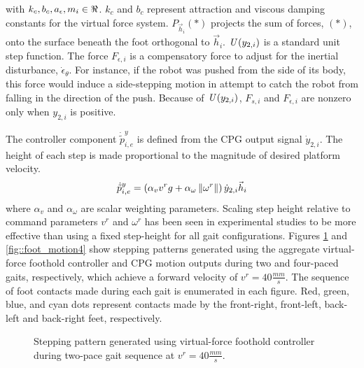 	 	with $k_{c},b_{c},a_{\epsilon},m_{i} \in \Re$.
		$k_{c}$ and $b_{c}$ represent  attraction and viscous damping constants for the virtual force system. ${P}_{\vec{h}_{i}}(*)$ projects the sum of  forces, $(*)$, onto the surface beneath the \Ith foot orthogonal to $\vec{h}_{i}$. $\emph{U}\left(y_{2,i}\right)$ is a standard unit step function. The force $F_{\epsilon,i}$ is a compensatory force to adjust for the inertial disturbance,  $\dot{\epsilon}_{\theta}$. For instance, if the robot was pushed from the side of its body, this force would induce a side-stepping motion in attempt to catch the robot from falling in the direction of the push. Because of $\emph{U}\left(y_{2,i}\right)$, $F_{s,i}$ and $F_{\epsilon,i}$ are nonzero only when $y_{2,i}$ is positive.

		The controller component $\dot{\tilde{p}}_{i,e}^{y}$ is defined from the CPG output signal $\dot{y}_{2,i}$. The height of each step is made proportional to the magnitude of desired platform velocity.
			\begin{equation}
				\dot{\tilde{p}}_{i,e}^{y} 	= { \left( \alpha_{v} v^{r}g + \alpha_{\omega} \left\lVert\omega^{r}\right\rVert \right) \dot{y}_{2,i}} \vec{h}_{i} 
				\label{eq::foot_height_control}
			\end{equation}
		where $\alpha_{v}$ and $\alpha_{\omega}$ are scalar weighting parameters. Scaling step height relative to command parameters $v^{r}$ and $\omega^{r}$ has been seen in experimental studies to be more effective than using a fixed step-height for all gait configurations. Figures \ref{fig::foot_motion2} and \ref{fig::foot_motion4} show stepping patterns generated using the aggregate virtual-force foothold controller and CPG motion outputs during two and four-paced gaits, respectively, which achieve a forward velocity of $v^{r}=40\frac{mm}{s}$. The sequence of foot contacts made during each gait is enumerated in each figure. Red, green, blue, and cyan dots represent contacts made by the front-right, front-left, back-left and back-right feet, respectively.
%
			\begin{figure}[!h]
				\centering
				\caption{Stepping pattern generated using virtual-force foothold controller during two-pace gait sequence at $v^{r}=40\frac{mm}{s}$.}
				\label{fig::foot_motion2}
			\end{figure}
